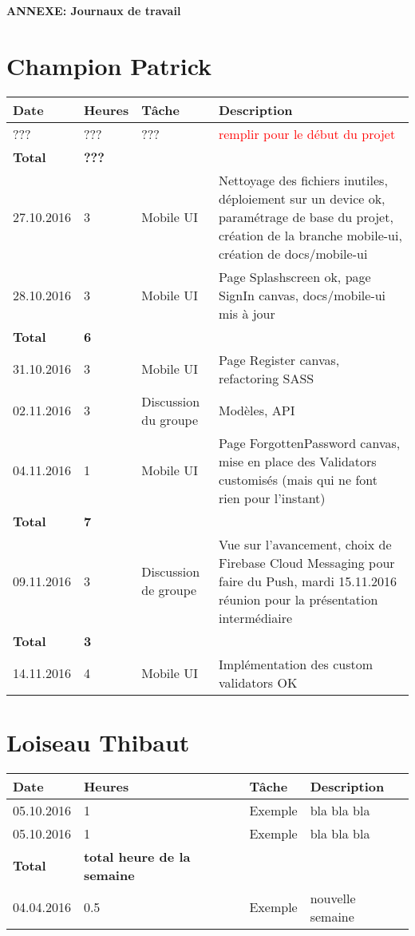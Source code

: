 \documentclass[french]{article}
\begin{document}
	\centering
	\large{\textbf{ANNEXE: Journaux de travail}}
	
	\justify
	
	\section*{Champion Patrick}
	\begin{longtable}{p{}|p{}|p{}|p{}}
		Date&Heures&Tâche&Description\\
		\hline \hline
		??? & ??? & ??? & \textcolor{red}{remplir pour le début du projet}\\
		\textbf{Total} & \textbf{???} &&\\
		\hline
		27.10.2016 & 3 & Mobile UI & Nettoyage des fichiers inutiles, déploiement sur un device ok, paramétrage de base du projet, création de la branche mobile-ui, création de docs/mobile-ui\\
		28.10.2016 & 3 & Mobile UI & Page Splashscreen ok, page SignIn canvas, docs/mobile-ui mis à jour\\
		\textbf{Total} & \textbf{6} &&\\
		\hline
		31.10.2016 & 3 & Mobile UI & Page Register canvas, refactoring SASS\\
		02.11.2016 & 3 & Discussion du groupe & Modèles, API\\
		04.11.2016 & 1 & Mobile UI & Page ForgottenPassword canvas, mise en place des Validators customisés (mais qui ne font rien pour l'instant)\\
		\textbf{Total} & \textbf{7} &&\\
		\hline
		09.11.2016 & 3 & Discussion de groupe & Vue sur l'avancement, choix de Firebase Cloud Messaging pour faire du Push, mardi 15.11.2016 réunion pour la présentation intermédiaire\\
		\textbf{Total} & \textbf{3} &&\\
		\hline
		14.11.2016 & 4 & Mobile UI & Implémentation des custom validators OK\\
	\end{longtable}

	\section*{Loiseau Thibaut}
	\begin{longtable}{p{}|p{}|p{}|p{}}
		Date&Heures&Tâche&Description\\
		\hline \hline
		05.10.2016 & 1 & Exemple & bla bla bla\\
		05.10.2016 & 1 & Exemple & bla bla bla\\
		\textbf{Total} & \textbf{total heure de la semaine} &&\\
		\hline
		04.04.2016 & 0.5 & Exemple & nouvelle semaine \\
	\end{longtable}
	
\end{document}
